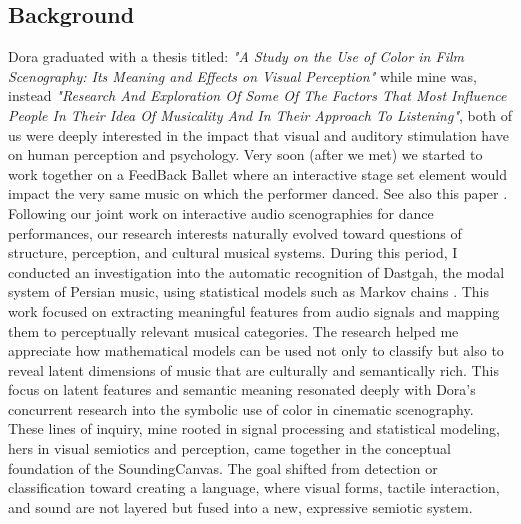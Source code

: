 \documentclass{article}
\begin{document}
\subsection{Background}
Dora graduated with a thesis titled: \emph{"A Study on the Use of Color in Film Scenography: Its Meaning and Effects on Visual Perception"} while mine was, instead \emph{"Research And Exploration Of Some Of The Factors That Most Influence People In Their Idea Of Musicality And In Their Approach To Listening"}, both of us were deeply interested in the impact that visual and auditory stimulation have on human perception and psychology. \newline 
Very soon (after we met) we started to work together on a FeedBack Ballet \cite{ballet} where an interactive stage set element would impact the very same music on which the performer danced. See also this paper \cite{accrocco_paper}. \newline 
Following our joint work on interactive audio scenographies for dance performances, our research interests naturally evolved toward questions of structure, perception, and cultural musical systems. During this period, I conducted an investigation into the automatic recognition of Dastgah, the modal system of Persian music, using statistical models such as Markov chains \cite{dastgah_markov}. This work focused on extracting meaningful features from audio signals and mapping them to perceptually relevant musical categories. The research helped me appreciate how mathematical models can be used not only to classify but also to reveal latent dimensions of music that are culturally and semantically rich. \newline
This focus on latent features and semantic meaning resonated deeply with Dora’s concurrent research into the symbolic use of color in cinematic scenography. These lines of inquiry, mine rooted in signal processing and statistical modeling, hers in visual semiotics and perception, came together in the conceptual foundation of the SoundingCanvas. The goal shifted from detection or classification toward creating a language, where visual forms, tactile interaction, and sound are not layered but fused into a new, expressive semiotic system.
\end{document}
